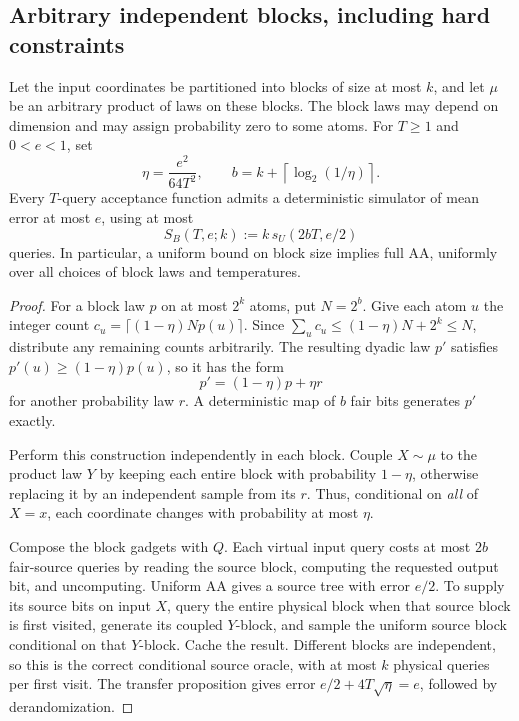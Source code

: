 \subsection{Arbitrary independent blocks, including hard constraints}
\label{sec:threshold-positive-blocks}

\begin{theorem}
\label{thm:threshold-block-products}
Let the input coordinates be partitioned into blocks of size at most
\(k\), and let \(\mu\) be an arbitrary product of laws on these
blocks. The block laws may depend on dimension and may assign
probability zero to some atoms. For \(T\ge1\) and \(0<e<1\), set
\[
 \eta=\frac{e^2}{64T^2},\qquad
 b=k+\left\lceil\log_2(1/\eta)\right\rceil.
\]
Every \(T\)-query acceptance function admits a deterministic simulator
of mean error at most \(e\), using at most
\[
 S_B(T,e;k):=k\,s_U(2bT,e/2)
\]
queries. In particular, a uniform bound on block size implies full AA,
uniformly over all choices of block laws and temperatures.
\end{theorem}

\begin{proof}
For a block law \(p\) on at most \(2^k\) atoms, put \(N=2^b\).
Give each atom \(u\) the integer count
\(c_u=\lceil(1-\eta)Np(u)\rceil\). Since
\(\sum_uc_u\le(1-\eta)N+2^k\le N\), distribute any remaining
counts arbitrarily. The resulting dyadic law \(p'\) satisfies
\(p'(u)\ge(1-\eta)p(u)\), so it has the form
\[
 p'=(1-\eta)p+\eta r
\]
for another probability law \(r\). A deterministic map of \(b\)
fair bits generates \(p'\) exactly.

Perform this construction independently in each block. Couple
\(X\sim\mu\) to the product law \(Y\) by keeping each entire block
with probability \(1-\eta\), otherwise replacing it by an independent
sample from its \(r\). Thus, conditional on \emph{all} of \(X=x\),
each coordinate changes with probability at most \(\eta\).

Compose the block gadgets with \(Q\). Each virtual input query costs
at most \(2b\) fair-source queries by reading the source block,
computing the requested output bit, and uncomputing. Uniform AA gives
a source tree with error \(e/2\). To supply its source bits on input
\(X\), query the entire physical block when that source block is first
visited, generate its coupled \(Y\)-block, and sample the uniform
source block conditional on that \(Y\)-block. Cache the result.
Different blocks are independent, so this is the correct conditional
source oracle, with at most \(k\) physical queries per first visit.
The transfer proposition gives error
\(e/2+4T\sqrt\eta=e\), followed by derandomization.
\end{proof}

